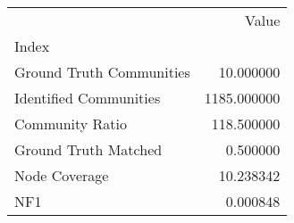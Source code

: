 \begin{tabular}{lr}
\toprule
{} &        Value \\
Index                    &              \\
\midrule
Ground Truth Communities &    10.000000 \\
Identified Communities   &  1185.000000 \\
Community Ratio          &   118.500000 \\
Ground Truth Matched     &     0.500000 \\
Node Coverage            &    10.238342 \\
NF1                      &     0.000848 \\
\bottomrule
\end{tabular}
